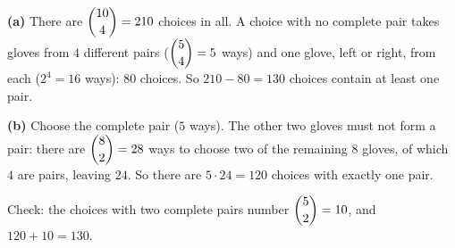 \textbf{(a)} There are $\dbinom{10}{4}=210$ choices in all. A choice with no complete pair takes gloves from $4$ different pairs ($\dbinom54=5$ ways) and one glove, left or right, from each ($2^4=16$ ways): $80$ choices. So $210-80=\boxed{130}$ choices contain at least one pair.

\textbf{(b)} Choose the complete pair ($5$ ways). The other two gloves must not form a pair: there are $\dbinom82=28$ ways to choose two of the remaining $8$ gloves, of which $4$ are pairs, leaving $24$. So there are $5\cdot24=\boxed{120}$ choices with exactly one pair.

Check: the choices with two complete pairs number $\dbinom52=10$, and $120+10=130$.
